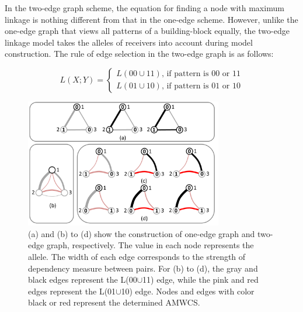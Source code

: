 
In the two-edge graph scheme, the equation for finding a node with maximum linkage is nothing different from that in the one-edge scheme. However, unlike the one-edge graph that views all patterns of a building-block equally, the two-edge linkage model takes the alleles of receivers into account during model construction. The rule of edge selection in the two-edge graph is as follows:

\begin{equation}
L(X;Y) = 
   \begin{cases}
    L(00\cup11) \text{, if pattern is 00 or 11} \\
    L(01\cup10) \text{, if pattern is 01 or 10} 
	\end{cases}
\end{equation}



\begin{figure}
\centering
\includegraphics[width=3.4in]{AMWCS}
\caption{(a)  and (b) to (d) show the construction of  one-edge graph and two-edge graph, respectively. The value in each node represents the allele. The width of each edge corresponds to the strength of dependency measure between pairs. For (b) to (d), the gray and black edges represent the L(00$\cup$11) edge, while the pink and red edges represent the L(01$\cup$10) edge. Nodes and edges with color black or red represent the determined AMWCS.}
\end{figure}



